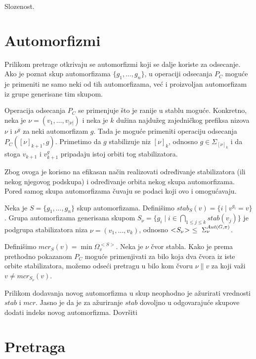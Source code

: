\documentclass[12pt,oneside]{memoir}
\theoremstyle{definition}
\begin{document}
  {\color{red} Slozenost.}

 \section{Automorfizmi}

  Prilikom pretrage otkrivaju se automorfizmi koji se dalje koriste za
  odsecanje. Ako je poznat skup automorfizama $\{g_1, \dots, g_n\}$, u
  operaciji odsecanja $P_C$ moguće je primeniti ne samo neki od tih
  automorfizama, već i proizvoljan automorfizam iz grupe generisane tim skupom.
  
  Operacija odsecanja $P_C$ se primenjuje što je ranije u stablu moguće.
  Konkretno, neka je $\nu = (v_1, \dots, v_{|\nu|})$ i neka je $k$ dužina
  najdužeg zajedničkog prefiksa nizova $\nu$ i $\nu^g$ za neki automorfizam
  $g$. Tada je moguće primeniti operaciju odsecanja $P_C([\nu]_{k+1}, g)$.
  Primetimo da $g$ stabilizuje niz $[\nu]_k$, odnosno $g \in \Sigma_{[\nu]_k}$
  i da stoga $v_{k+1}$ i $v_{k+1}^g$ pripadaju istoj orbiti tog stabilizatora.

  Zbog ovoga je korisno na efikasan način realizovati određivanje stabilizatora
  (ili nekog njegovog podskupa) i određivanje orbita nekog skupa automorfizama.
  Pored samog skupa automorfizama čuvaju se podaci koji ovo i omogućavaju.

  Neka je $S = \{g_1, \dots, g_n\}$ skup automorfizama. Definišimo $stab_S(v) =
  \{i \mid v^{g_i} = v\}$. Grupa automorfizama generisana skupom $S_\nu = \{g_i
  \mid i \in \bigcap_{1 \leq j \leq k} stab(v_j)\}$ je podgrupa stabilizatora
  niza $\nu = (v_1, \dots, v_k)$, odnosno $< \negmedspace S_\nu \negmedspace >
  \  \leq \  \Sigma^{Aut(G, \pi)}_\nu$.

  Definišimo $mcr_S(v) = \min \Omega_v^{< S >}$. Neka je $\nu$ čvor stabla.
  Kako je prema prethodno pokazanom $P_C$ moguće primenjivati za bilo koja dva
  čvora iz iste orbite stabilizatora, možemo odseći pretragu u bilo kom čvoru
  $\nu \| v$ za koji važi $v \neq mcr_{S_\nu}(v)$.

  Prilikom dodavanja novog automorfizma u skup neophodno je ažurirati vrednosti
  $stab$ i $mcr$. Jasno je da je za ažuriranje $stab$ dovoljno u odgovarajuće
  skupove dodati indeks novog automorfizma. {\color{red} Dovršiti}

 \section{Pretraga}
\end{document}

